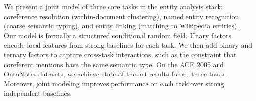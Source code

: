 We present a joint model of three core tasks in the entity analysis stack: coreference resolution (within-document clustering), named entity recognition (coarse semantic typing), and entity linking (matching to Wikipedia entities). Our model is formally a structured conditional random field. Unary factors encode local features from strong baselines for each task. We then add binary and ternary factors to capture cross-task interactions, such as the constraint that coreferent mentions have the same semantic type. On the ACE 2005 and OntoNotes datasets, we achieve state-of-the-art results for all three tasks. Moreover, joint modeling improves performance on each task over strong independent baselines.
